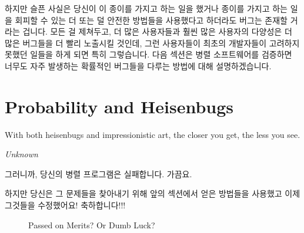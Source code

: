 하지만 슬픈 사실은 당신이 이 종이를 가지고 하는 일을 했거나 종이를 가지고 하는
일을 회피할 수 있는 더 또는 덜 안전한 방법들을 사용했다고 하더라도 버그는
존재할 거라는 겁니다.
모든 걸 제쳐두고, 더 많은 사용자들과 훨씬 많은 사용자의 다양성은 더 많은
버그들을 더 빨리 노출시킬 것인데, 그런 사용자들이 최초의 개발자들이 고려하지
못했던 일들을 하게 되면 특히 그렇습니다.
다음 섹션은 병렬 소프트웨어를 검증하면 너무도 자주 발생하는 확률적인 버그들을
다루는 방법에 대해 설명하겠습니다.

\section{Probability and Heisenbugs}
\label{sec:debugging:Probability and Heisenbugs}
%
\epigraph{With both heisenbugs and impressionistic art, the closer you
	  get, the less you see.}
	 {\emph{Unknown}}

그러니까, 당신의 병렬 프로그램은 실패합니다.
가끔요.

하지만 당신은 그 문제들을 찾아내기 위해 앞의 섹션에서 얻은 방법들을 사용했고
이제 그것들을 수정했어요!
축하합니다!!!

\begin{figure}[tb]
\centering
{}
\caption{Passed on Merits?  Or Dumb Luck?}
\end{figure}

